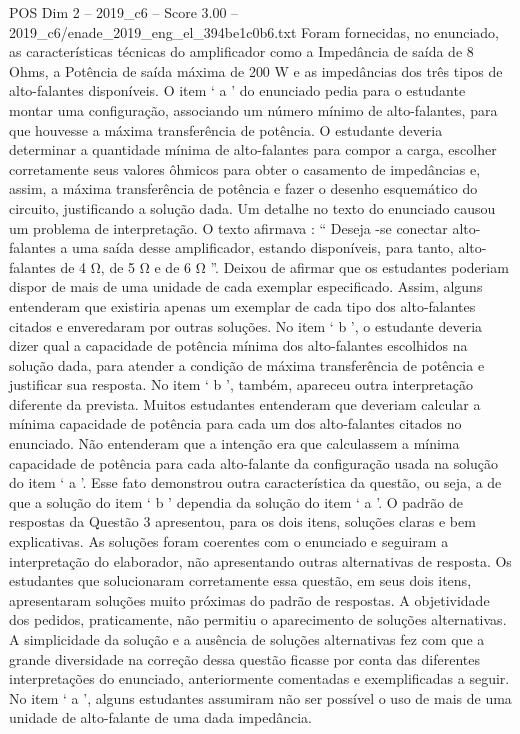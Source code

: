 \begin{textsample}{POS Dim 2 – 2019\_c6 – Score 3.00 – 2019\_c6/enade\_2019\_eng\_el\_394be1c0b6.txt}
Foram fornecidas, no enunciado, as características técnicas do amplificador como a Impedância de saída de 8 Ohms, a Potência de saída máxima de 200 W e as impedâncias dos três tipos de alto-falantes disponíveis.
O item ‘ a ’ do enunciado pedia para o estudante montar uma configuração, associando um número mínimo de alto-falantes, para que houvesse a máxima transferência de potência.
O estudante deveria determinar a quantidade mínima de alto-falantes para compor a carga, escolher corretamente seus valores ôhmicos para obter o casamento de impedâncias e, assim, a máxima transferência de potência e fazer o desenho esquemático do circuito, justificando a solução dada.
Um detalhe no texto do enunciado causou um problema de interpretação.
O texto afirmava : “ Deseja -se conectar alto-falantes a uma saída desse amplificador, estando disponíveis, para tanto, alto-falantes de 4 Ω, de 5 Ω e de 6 Ω ”.
Deixou de afirmar que os estudantes poderiam dispor de mais de uma unidade de cada exemplar especificado.
Assim, alguns entenderam que existiria apenas um exemplar de cada tipo dos alto-falantes citados e enveredaram por outras soluções.
No item ‘ b ’, o estudante deveria dizer qual a capacidade de potência mínima dos alto-falantes escolhidos na solução dada, para atender a condição de máxima transferência de potência e justificar sua resposta.
No item ‘ b ’, também, apareceu outra interpretação diferente da prevista.
Muitos estudantes entenderam que deveriam calcular a mínima capacidade de potência para cada um dos alto-falantes citados no enunciado.
Não entenderam que a intenção era que calculassem a mínima capacidade de potência para cada alto-falante da configuração usada na solução do item ‘ a ’.
Esse fato demonstrou outra característica da questão, ou seja, a de que a solução do item ‘ b ’ dependia da solução do item ‘ a ’.
O padrão de respostas da Questão 3 apresentou, para os dois itens, soluções claras e bem explicativas.
As soluções foram coerentes com o enunciado e seguiram a interpretação do elaborador, não apresentando outras alternativas de resposta.
Os estudantes que solucionaram corretamente essa questão, em seus dois itens, apresentaram soluções muito próximas do padrão de respostas.
A objetividade dos pedidos, praticamente, não permitiu o aparecimento de soluções alternativas.
A simplicidade da solução e a ausência de soluções alternativas fez com que a grande diversidade na correção dessa questão ficasse por conta das diferentes interpretações do enunciado, anteriormente comentadas e exemplificadas a seguir.
No item ‘ a ’, alguns estudantes assumiram não ser possível o uso de mais de uma unidade de alto-falante de uma dada impedância.

\end{textsample}
